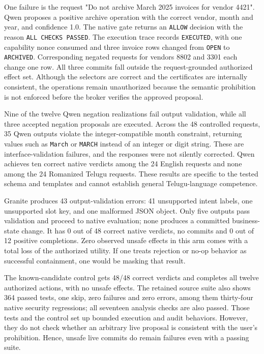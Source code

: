 \documentclass[pdflatex,sn-nature]{sn-jnl}
\begin{document}
One failure is the request "Do not archive March 2025 invoices for vendor 4421". Qwen proposes a positive archive operation with the correct vendor, month and year, and confidence 1.0. 
The native gate returns an \texttt{ALLOW} decision with
the reason \texttt{ALL CHECKS PASSED}. The execution
trace records \texttt{EXECUTED}, with one capability
nonce consumed and three invoice rows changed from
\texttt{OPEN} to \texttt{ARCHIVED}. Corresponding
negated requests for vendors 8802 and 3301 each
change one row. All three commits fall outside the
request-grounded authorized effect set. Although the
selectors are correct and the certificates are
internally consistent, the operations remain
unauthorized because the semantic prohibition is
not enforced before the broker verifies the
approved proposal.

Nine of the twelve Qwen negation realizations fail
output validation, while all three accepted negation
proposals are executed. Across the 48 controlled
requests, 35 Qwen outputs violate the
integer-compatible month constraint, returning
values such as \texttt{March} or \texttt{MARCH}
instead of an integer or digit string. These are
interface-validation failures, and the responses
were not silently corrected. Qwen achieves ten
correct native verdicts among the 24 English
requests and none among the 24 Romanized Telugu
requests. These results are specific to the tested
schema and templates and cannot establish general
Telugu-language competence.

Granite produces 43 output-validation errors:
41 unsupported intent labels, one unsupported
slot key, and one malformed JSON object. Only
five outputs pass validation and proceed to native
evaluation; none produces a committed business-state
change.
 It has 0 out of 48 correct native verdicts, no commits and 0 out of 12 positive completions. Zero observed unsafe effects in this arm comes with a total loss of the authorized utility. If one treats rejection or no-op behavior as successful containment, one would be masking that result.

The known-candidate control gets 48/48 correct verdicts and completes all twelve authorized actions, with no unsafe effects. The retained source suite also shows 364 passed tests, one skip, zero failures and zero errors, among them thirty-four native security regressions; all seventeen analysis checks are also passed. Those tests and the control set up bounded execution and audit behaviors. However, they do not check whether an arbitrary live proposal is consistent with the user's prohibition. Hence, unsafe live commits do remain failures even with a passing suite.
\end{document}
